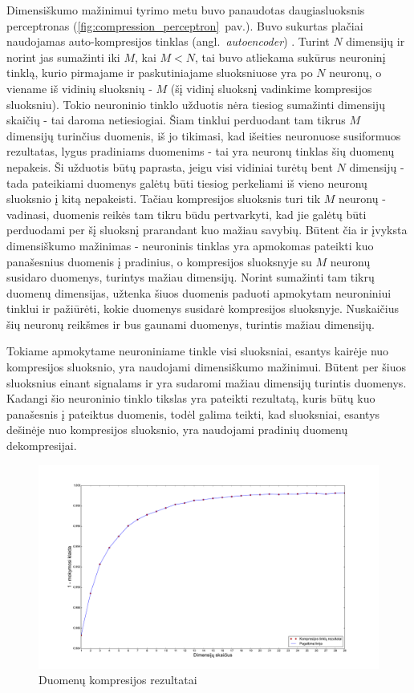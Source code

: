 \documentclass{VUMIFPSbakalaurinis}
\begin{document}
Dimensiškumo mažinimui tyrimo metu buvo panaudotas daugiasluoksnis perceptronas (\ref{fig:compression_perceptron}~pav.).
Buvo sukurtas plačiai naudojamas auto-kompresijos tinklas (angl.~\textit{autoencoder}) \cite[505~psl.]{autoencoder}.
Turint $N$ dimensijų ir norint jas sumažinti iki $M$, kai $M < N$, tai buvo atliekama sukūrus neuroninį tinklą, kurio pirmajame ir paskutiniajame sluoksniuose yra po $N$ neuronų, o viename iš vidinių sluoksnių - $M$ (šį vidinį sluoksnį vadinkime kompresijos sluoksniu).
Tokio neuroninio tinklo užduotis nėra tiesiog sumažinti dimensijų skaičių - tai daroma netiesiogiai.
Šiam tinklui perduodant tam tikrus $M$ dimensijų turinčius duomenis, iš jo tikimasi, kad išeities neuronuose susiformuos rezultatas, lygus pradiniams duomenims - tai yra neuronų tinklas šių duomenų nepakeis.
Ši užduotis būtų paprasta, jeigu visi vidiniai turėtų bent $N$ dimensijų - tada pateikiami duomenys galėtų būti tiesiog perkeliami iš vieno neuronų sluoksnio į kitą nepakeisti.
Tačiau kompresijos sluoksnis turi tik $M$ neuronų - vadinasi, duomenis reikės tam tikru būdu pertvarkyti, kad jie galėtų būti perduodami per šį sluoksnį prarandant kuo mažiau savybių.
Būtent čia ir įvyksta dimensiškumo mažinimas - neuroninis tinklas yra apmokomas pateikti kuo panašesnius duomenis į pradinius, o kompresijos sluoksnyje su $M$ neuronų susidaro duomenys, turintys mažiau dimensijų.
Norint sumažinti tam tikrų duomenų dimensijas, užtenka šiuos duomenis paduoti apmokytam neuroniniui tinklui ir pažiūrėti, kokie duomenys susidarė kompresijos sluoksnyje.
Nuskaičius šių neuronų reikšmes ir bus gaunami duomenys, turintis mažiau dimensijų.

Tokiame apmokytame neuroniniame tinkle visi sluoksniai, esantys kairėje nuo kompresijos sluoksnio, yra naudojami dimensiškumo mažinimui.
Būtent per šiuos sluoksnius einant signalams ir yra sudaromi mažiau dimensijų turintis duomenys.
Kadangi šio neuroninio tinklo tikslas yra pateikti rezultatą, kuris būtų kuo panašesnis į pateiktus duomenis, todėl galima teikti, kad sluoksniai, esantys dešinėje nuo kompresijos sluoksnio, yra naudojami pradinių duomenų dekompresijai.

\begin{figure}[h]
	\centering
	\includegraphics[scale=0.25]{pics/compression_dimensions}
	\caption{Duomenų kompresijos rezultatai}
	\label{fig:compression_dimensions}
\end{figure}
\end{document}
